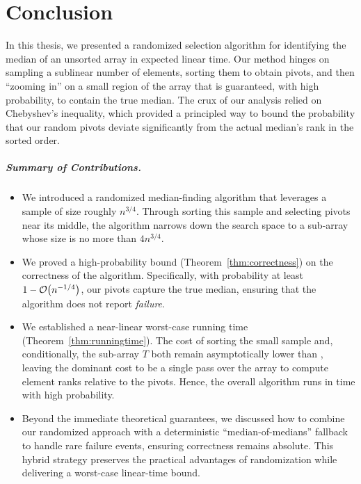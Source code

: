 
\chapter{Conclusion}
\label{ch:conclusion}

In this thesis, we presented a randomized selection algorithm for identifying the median of an unsorted array in expected linear time. Our method hinges on sampling a sublinear number of elements, sorting them to obtain pivots, and then “zooming in” on a small region of the array that is guaranteed, with high probability, to contain the true median. The crux of our analysis relied on Chebyshev’s inequality, which provided a principled way to bound the probability that our random pivots deviate significantly from the actual median’s rank in the sorted order.

\paragraph{Summary of Contributions.}
\begin{itemize}
    \item We introduced a randomized median-finding algorithm that leverages a sample of size roughly \( n^{3/4}\). Through sorting this sample and selecting pivots near its middle, the algorithm narrows down the search space to a sub-array whose size is no more than \(4n^{3/4}\).
    \item We proved a high-probability bound (Theorem~\ref{thm:correctness}) on the correctness of the algorithm. Specifically, with probability at least \(1 - \Oh*{n^{-1/4}}\), our pivots capture the true median, ensuring that the algorithm does not report \emph{failure}.
    \item We established a near-linear worst-case running time (Theorem~\ref{thm:runningtime}). The cost of sorting the small sample and, conditionally, the sub-array \(T\) both remain asymptotically lower than , leaving the dominant cost to be a single pass over the array to compute element ranks relative to the pivots. Hence, the overall algorithm runs in  time with high probability.
    \item Beyond the immediate theoretical guarantees, we discussed how to combine our randomized approach with a deterministic “median-of-medians” fallback to handle rare failure events, ensuring correctness remains absolute. This hybrid strategy preserves the practical advantages of randomization while delivering a worst-case linear-time bound.
\end{itemize}


